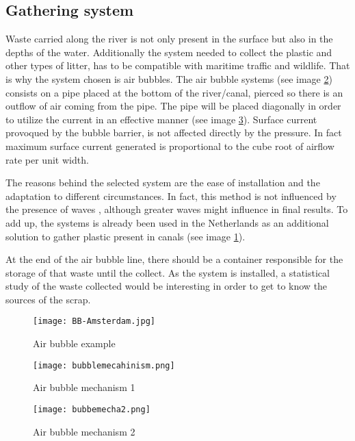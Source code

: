 \documentclass[twoside,a4paper,12pt]{report}
\begin{document}
\subsection{Gathering system}
Waste carried along the river is not only present in the surface but also in the depths of the water. Additionally the system needed to collect the plastic and other types of litter, has to be compatible with maritime traffic and wildlife. That is why the system chosen is air bubbles.
The air bubble systems (see image \ref{airbubblemech1}) consists on a pipe placed at the bottom of the river/canal, pierced so there is an outflow of air coming from the pipe. The pipe will be placed diagonally in order to utilize the current in an effective manner (see image \ref{airbubblemech2}). Surface current provoqued by the bubble barrier, is not affected directly by the pressure. In fact maximum surface current generated is proportional to the cube root of airflow rate per
unit width\cite{Lo1991}.

The reasons behind the selected system are the ease of installation and the adaptation to different circumstances. In fact, this method is not influenced by the presence of waves \cite{airbubble}, although greater waves might influence in final results. To add up, the systems is already been used in the Netherlands as an additional solution to gather plastic present in canals (see image \ref{airbubblepic}).


At the end of the air bubble line, there should be a container responsible for the storage of that waste until the collect. As the system is installed, a statistical study of the waste collected would be interesting  in order to get to know the sources of the scrap.

\begin{figure}
    \centering
    \texttt{[image: BB-Amsterdam.jpg]}
    \caption{Air bubble example \cite{thegreatbubble}}
     \label{airbubblepic} 
\end{figure}

\begin{figure}
    \centering
    \texttt{[image: bubblemecahinism.png]}
    \caption{Air bubble mechanism 1}
     \label{airbubblemech1} 
\end{figure}

\begin{figure}
    \centering
    \texttt{[image: bubbemecha2.png]}
    \caption{Air bubble mechanism 2}
     \label{airbubblemech2} 
\end{figure}
\end{document}
